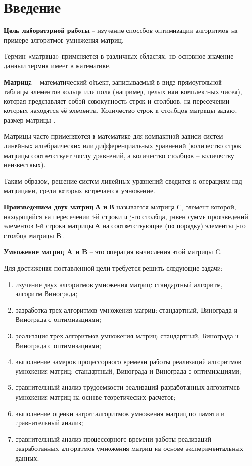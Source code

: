 \chapter*{Введение}
\textbf{Цель лабораторной работы} -- изучение способов оптимизации алгоритмов на примере алгоритмов умножения матриц.

Термин «матрица» применяется в различных областях, но основное значение данный термин имеет в математике.

\textbf{Матрица} -- математический объект, записываемый в виде прямоугольной таблицы элементов кольца или поля (например, целых или комплексных чисел), которая представляет собой совокупность строк и столбцов, на пересечении которых находятся её элементы. Количество строк и столбцов матрицы задают размер матрицы \cite{matrix}.

Матрицы часто применяются в математике для компактной записи систем линейных алгебраических или дифференциальных уравнений (количество строк матрицы соответствует числу уравнений, а количество столбцов -- количеству неизвестных).

Таким образом, решение систем линейных уравнений сводится к операциям над матрицами, среди которых встречается умножение.

\textbf{Произведением двух матриц А и В} называется матрица С, элемент которой, находящийся на пересечении i-й строки и j-го столбца, равен сумме произведений элементов i-й строки матрицы А на соответствующие (по порядку) элементы j-го столбца матрицы В \cite{matrix2}.

\textbf{Умножение матриц A и B} -- это операция вычисления этой матрицы C.

Для достижения поставленной цели требуется решить следующие задачи:
\begin{enumerate}[label={\arabic*)}]
    \item изучение двух алгоритмов умножения матриц: стандартный алгоритм, алгоритм Винограда;
    \item разработка трех алгоритмов умножения матриц: стандартный, Винограда и Винограда с оптимизациями;
    \item реализация трех алгоритмов умножения матриц: стандартный, Винограда и Винограда с оптимизациями;
    \item выполнение замеров процессорного времени работы реализаций алгоритмов умножения матриц: стандартный, Винограда и Винограда с оптимизациями;
	\item сравнительный анализ трудоемкости реализаций разработанных алгоритмов умножения матриц на основе теоретических расчетов;
	\item выполнение оценки затрат алгоритмов умножения матриц по памяти и сравнительный анализ;
	\item сравнительный анализ процессорного времени работы реализаций разработанных алгоритмов умножения матриц на основе экспериментальных данных.
\end{enumerate}
